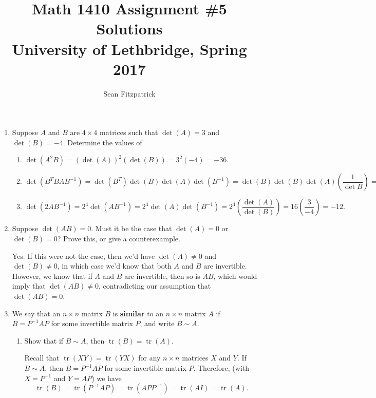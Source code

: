 \documentclass[letterpaper,12pt]{article}
\title{Math 1410 Assignment \#5 Solutions\\University of Lethbridge, Spring 2017}
\author{Sean Fitzpatrick}
\begin{document}
 \maketitle


\begin{enumerate}
\item Suppose $A$ and $B$ are $4\times 4$ matrices such that $\det(A) = 3$ and $\det(B)=-4$. Determine the values of
\begin{enumerate}
 \item $\det(A^2B) = (\det(A))^2(\det(B))=3^2(-4) = -36.$
 \item $\det(B^TBAB^{-1}) = \det(B^T)\det(B)\det(A)\det(B^{-1}) = \det(B)\det(B)\det(A)\left(\dfrac{1}{\det{B}}\right)=\det(B)\det(A) = -12.$
 \item $\det(2AB^{-1})=2^4\det(AB^{-1}) = 2^4\det(A)\det(B^{-1}) = 2^4\left(\dfrac{\det(A)}{\det(B)}\right) = 16\left(\dfrac{3}{-4}\right)=-12.$
\end{enumerate}

\medskip

\item Suppose $\det(AB)=0$. Must it be the case that $\det(A)=0$ or $\det(B)=0$? Prove this, or give a counterexample.

\bigskip

Yes. If this were not the case, then we'd have $\det(A)\neq 0$ and $\det(B)\neq 0$, in which case we'd know that both $A$ and $B$ are invertible. However, we know that if $A$ and $B$ are invertible, then so is $AB$, which would imply that $\det(AB)\neq 0$, contradicting our assumption that $\det(AB)=0$.

\medskip

\item We say that an $n\times n$ matrix $B$ is \textbf{similar} to an $n\times n$ matrix $A$ if $B=P^{-1}AP$ for some invertible matrix $P$, and write $B\sim A$.
\begin{enumerate}
 \item Show that if $B\sim A$, then $\operatorname{tr}(B)=\operatorname{tr}(A)$.

\medskip

Recall that $\operatorname{tr}(XY) = \operatorname{tr}(YX)$ for any $n\times n$ matrices $X$ and $Y$. If $B\sim A$, then $B=P^{-1}AP$ for some invertible matrix $P$. Therefore, (with $X=P^{-1}$ and $Y=AP$) we have
\[
 \operatorname{tr}(B) = \operatorname{tr}(P^{-1}AP) = \operatorname{tr}(APP^{-1}) = \operatorname{tr}(AI) = \operatorname{tr}(A).
\]


\end{enumerate}
\end{enumerate}
\end{document}
